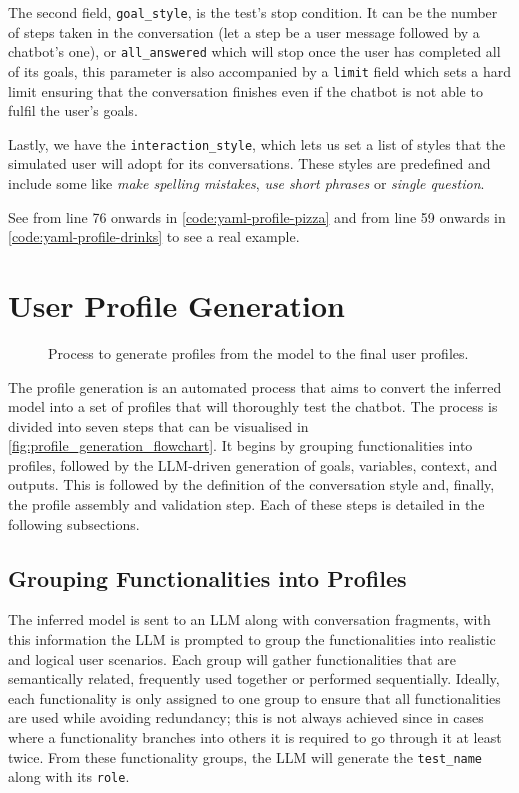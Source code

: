 The second field, \texttt{goal\_style}, is the test's stop condition.
It can be the number of steps taken in the conversation
(let a step be a user message followed by a chatbot's one),
or \texttt{all\_answered} which will stop once the user has completed all of its goals,
this parameter is also accompanied by a \texttt{limit} field which sets a hard limit
ensuring that the conversation finishes even if the chatbot is not able to fulfil the user's goals.

Lastly, we have the \texttt{interaction\_style},
which lets us set a list of styles that the simulated user will adopt for its conversations.
These styles are predefined and include some like
\textit{make spelling mistakes}, \textit{use short phrases}
or \textit{single question}.

See from line 76 onwards in \autoref{code:yaml-profile-pizza}
and from line 59 onwards in \autoref{code:yaml-profile-drinks}
to see a real example.

\section{User Profile Generation}\label{sec:profile-generation}

\begin{figure}[htpb]
    \centering
    
    \caption{Process to generate profiles from the model to the final user profiles.}
    \label{fig:profile_generation_flowchart}
\end{figure}

The profile generation is an automated process
that aims to convert the inferred model
into a set of profiles that will thoroughly test the chatbot.
The process is divided into seven steps that can be visualised in \autoref{fig:profile_generation_flowchart}.
It begins by
grouping functionalities into profiles,
followed by the \ac{LLM}-driven generation of goals, variables, context, and outputs.
This is followed by the definition of the conversation style and,
finally, the profile assembly and validation step.
Each of these steps is detailed in the following subsections.

\subsection{Grouping Functionalities into Profiles}

The inferred model is sent to an \ac{LLM} along with conversation fragments,
with this information the \ac{LLM} is prompted to
group the functionalities into realistic and logical user scenarios.
Each group will gather functionalities that are semantically related,
frequently used together or performed sequentially.
Ideally, each functionality is only assigned to one group
to ensure that all functionalities are used while avoiding redundancy;
this is not always achieved since in cases where a functionality branches into others
it is required to go through it at least twice.
From these functionality groups, the \ac{LLM} will generate
the \texttt{test\_name} along with its \texttt{role}.

